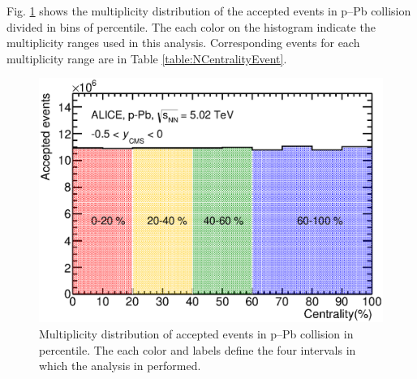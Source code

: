 





 Fig. \ref{fig:pPb:Centrality} shows the multiplicity distribution of the accepted events in p--Pb collision divided in bins of percentile. The each color on the histogram indicate the multiplicity ranges used in this analysis. Corresponding events for each multiplicity range are in Table \ref{table:NCentralityEvent}. 
 

\begin{figure}[htbp]
\begin{center}
\includegraphics[width=10.cm]{./Version1/FigChapter5/Selection/pPbCentrality.eps}
\caption{ Multiplicity distribution of accepted events in p--Pb collision in percentile. The each color and labels define the four intervals in which the analysis in performed.}
\label{fig:pPb:Centrality}
\end{center}
\end{figure}


